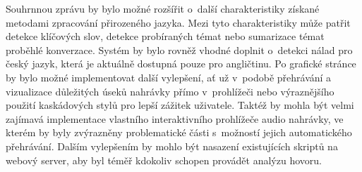 Souhrnnou zprávu by bylo možné rozšířit o~další charakteristiky získané metodami zpracování přirozeného jazyka. Mezi tyto charakteristiky může patřit detekce klíčových slov, detekce probíraných témat nebo sumarizace témat proběhlé konverzace. Systém by bylo rovněž vhodné doplnit o~detekci nálad pro český jazyk, která je aktuálně dostupná pouze pro angličtinu. Po grafické stránce by bylo možné implementovat  další vylepšení, ať už v~podobě přehrávání a vizualizace důležitých úseků nahrávky přímo v~prohlížeči nebo výraznějšího použití kaskádových stylů pro lepší zážitek uživatele. Taktéž by mohla být velmi zajímavá implementace vlastního interaktivního prohlížeče audio nahrávky, ve kterém by byly zvýrazněny problematické části s~možností jejich automatického přehrávání. Dalším vylepšením by mohlo být nasazení existujících skriptů na webový server, aby byl téměř kdokoliv schopen provádět analýzu hovoru.